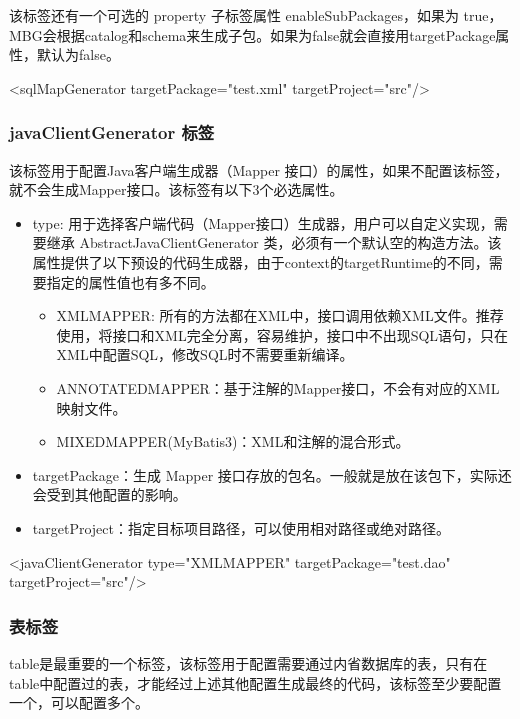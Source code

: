 该标签还有一个可选的 property 子标签属性 enableSubPackages，如果为 true，MBG会根据catalog和schema来生成子包。如果为false就会直接用targetPackage属性，默认为false。

\begin{xml}
<sqlMapGenerator targetPackage="test.xml" targetProject="src\main\resources"/>
\end{xml}

\subsubsection*{javaClientGenerator 标签}

该标签用于配置Java客户端生成器（Mapper 接口）的属性，如果不配置该标签，就不会生成Mapper接口。该标签有以下3个必选属性。

\begin{itemize}
    \item type: 用于选择客户端代码（Mapper接口）生成器，用户可以自定义实现，需要继承 AbstractJavaClientGenerator 类，必须有一个默认空的构造方法。该属性提供了以下预设的代码生成器，由于context的targetRuntime的不同，需要指定的属性值也有多不同。
    \begin{itemize}
        \item XMLMAPPER: 所有的方法都在XML中，接口调用依赖XML文件。推荐使用，将接口和XML完全分离，容易维护，接口中不出现SQL语句，只在XML中配置SQL，修改SQL时不需要重新编译。
        \item ANNOTATEDMAPPER：基于注解的Mapper接口，不会有对应的XML映射文件。
        \item MIXEDMAPPER(MyBatis3)：XML和注解的混合形式。
    \end{itemize}
    \item targetPackage：生成 Mapper 接口存放的包名。一般就是放在该包下，实际还会受到其他配置的影响。
    \item targetProject：指定目标项目路径，可以使用相对路径或绝对路径。
\end{itemize}

\begin{xml}
<javaClientGenerator type="XMLMAPPER" targetPackage="test.dao" targetProject="src\main\java"/>
\end{xml}

\subsubsection{表标签}

table是最重要的一个标签，该标签用于配置需要通过内省数据库的表，只有在table中配置过的表，才能经过上述其他配置生成最终的代码，该标签至少要配置一个，可以配置多个。

